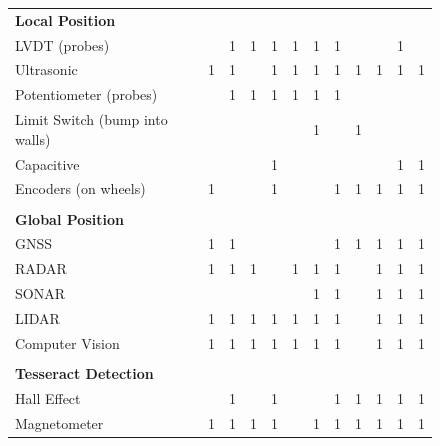 \documentclass[12pt]{article}
\begin{document}
\begin{figure}[htb!]
\begin{table}[H]
\begin{tabular}{p{15.645em}|c|c|c|c|c|c|c|c|c|c|c}
    \midrule
    \textbf{Local Position} &       &       &       &       &       &       &       &       &       &       &  \\
    LVDT (probes) &       & 1     & 1     & 1     & 1     & 1     & 1     &       &       & 1     &  \\
\rowcolor{green}    Ultrasonic & 1     & 1     &       & 1     & 1     & 1     & 1     & 1     & 1     & 1     & 1 \\
    Potentiometer (probes) &       & 1     & 1     & 1     & 1     & 1     & 1     &       &       &       &  \\
    Limit Switch (bump into walls) &       &       &       &       &       & 1     &       & 1     &       &       &  \\
    Capacitive &       &       &       & 1     &       &       &       &       &       & 1     & 1 \\
    Encoders (on wheels) & 1     &       &       & 1     &       &       & 1     & 1     & 1     & 1     & 1 \\
    \multicolumn{1}{r|}{} &       &       &       &       &       &       &       &       &       &       &  \\
    \midrule
    \textbf{Global Position} &       &       &       &       &       &       &       &       &       &       &  \\
\rowcolor{green}    GNSS  & 1     & 1     &       &       &       &       & 1     & 1     & 1     & 1     & 1 \\
    RADAR & 1     & 1     & 1     &       & 1     & 1     & 1     &       & 1     & 1     & 1 \\
    SONAR &       &       &       &       &       & 1     & 1     &       & 1     & 1     & 1 \\
\rowcolor{green}    LIDAR & 1     & 1     & 1     & 1     & 1     & 1     & 1     &       & 1     & 1     & 1 \\
    Computer Vision & 1     & 1     & 1     & 1     & 1     & 1     & 1     &       & 1     & 1     & 1 \\
    \multicolumn{1}{r|}{} &       &       &       &       &       &       &       &       &       &       &  \\
    \midrule
    \textbf{Tesseract Detection} &       &       &       &       &       &       &       &       &       &       &  \\
    Hall Effect &       & 1     &       & 1     &       &       & 1     & 1     & 1     & 1     & 1 \\
\rowcolor{green}    Magnetometer & 1     & 1     & 1     & 1     &       & 1     & 1     & 1     & 1     & 1     & 1 \\

\end{tabular}
\end{table}
\end{figure}
\end{document}
